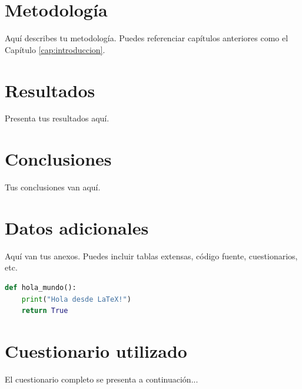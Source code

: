 \documentclass[12pt, a4paper]{report}
\begin{document}
\chapter{Metodología}
\label{cap:metodologia}

Aquí describes tu metodología. Puedes referenciar capítulos anteriores como el Capítulo \ref{cap:introduccion}.

\chapter{Resultados}
\label{cap:resultados}

Presenta tus resultados aquí.

\chapter{Conclusiones}
\label{cap:conclusiones}

Tus conclusiones van aquí.

\printbibliography[heading=bibintoc, title={Referencias}]

\begin{appendices}
\chapter{Datos adicionales}
\label{anexo:datos}

Aquí van tus anexos. Puedes incluir tablas extensas, código fuente, cuestionarios, etc.

\begin{lstlisting}[language=Python, caption={Código de ejemplo}]
def hola_mundo():
    print("Hola desde LaTeX!")
    return True
\end{lstlisting}

\chapter{Cuestionario utilizado}
\label{anexo:cuestionario}

El cuestionario completo se presenta a continuación...

\end{appendices}
\end{document}
